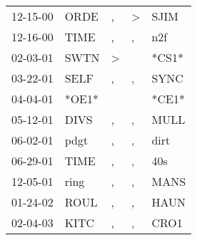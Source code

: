 \begin{supertabular}{lllll}
 12-15-00 &   ORDE &             , &  \textgreater &   SJIM \\
 12-16-00 &   TIME &             , &             , &    n2f \\
 02-03-01 &   SWTN &  \textgreater &               &  *CS1* \\
 03-22-01 &   SELF &             , &             , &   SYNC \\
 04-04-01 &  *OE1* &               &               &  *CE1* \\
 05-12-01 &   DIVS &             , &             , &   MULL \\
 06-02-01 &   pdgt &             , &             , &   dirt \\
 06-29-01 &   TIME &             , &             , &    40s \\
 12-05-01 &   ring &             , &             , &   MANS \\
 01-24-02 &   ROUL &             , &             , &   HAUN \\
 02-04-03 &   KITC &             , &             , &   CRO1 \\
\end{supertabular}
